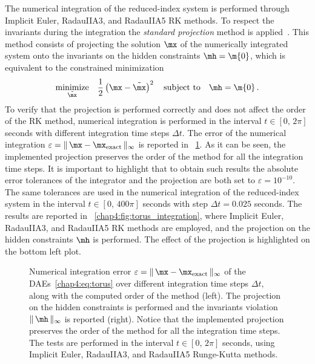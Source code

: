 The numerical integration of the reduced-index system is performed through Implicit Euler, RadauIIA3, and RadauIIA5 \ac{RK} methods. To respect the invariants during the integration the \emph{standard projection} method is applied~\cite{hairer2000symmetric}. This method consists of projecting the solution $\mx$ of the numerically integrated system onto the invariants on the hidden constraints $\mh = \m{0}$, which is equivalent to the constrained minimization
%
\begin{equation*}
  \underset{\tilde{\mx}}{\textrm{minimize}} \quad \dfrac{1}{2}\left(\mx - \tilde{\mx}\right)^2
    \quad \textrm{subject to} \quad
    \mh = \m{0} \, \text{.}
\end{equation*}
%
To verify that the projection is performed correctly and does not affect the order of the \ac{RK} method, numerical integration is performed in the interval $t \in [0, \, 2\pi]$ seconds with different integration time steps $\Delta t$. The error of the numerical integration $\varepsilon = \| \, \mx - \mx_\text{exact} \, \|_{\infty}$ is reported in \figurename~\ref{chap4:fig:torus_order}. As it can be seen, the implemented projection preserves the order of the method for all the integration time steps. It is important to highlight that to obtain such results the absolute error tolerances of the integrator and the projection are both set to $\varepsilon = 10^{-10}$. The same tolerances are used in the numerical integration of the reduced-index system in the interval $t \in [0, \, 400\pi]$ seconds with step $\Delta t = 0.025$ seconds. The results are reported in \figurename~\ref{chap4:fig:torus_integration}, where Implicit Euler, RadauIIA3, and RadauIIA5 \ac{RK} methods are employed, and the projection on the hidden constraints $\mh$ is performed. The effect of the projection is highlighted on the bottom left plot.

\begin{figure}[htb]
  \centering
  \small{}
  \caption{Numerical integration error $\varepsilon = \| \, \mx - \mx_\text{exact} \, \|_{\infty}$ of the \acp{DAE}~\eqref{chap4:eq:torus} over different integration time steps $\Delta t$, along with the computed order of the method (left). The projection on the hidden constraints is performed and the invariants violation $\| \, \mh \, \|_{\infty}$ is reported (right). Notice that the implemented projection preserves the order of the method for all the integration time steps. The tests are performed in the interval $t \in [0, \, 2\pi]$ seconds, using Implicit Euler, RadauIIA3, and RadauIIA5 Runge-Kutta methods.}
  \label{chap4:fig:torus_order}
\end{figure}

